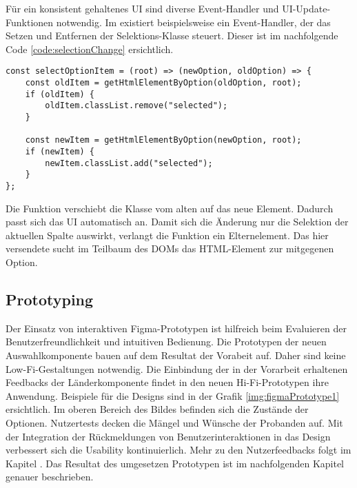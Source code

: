 Für ein konsistent gehaltenes UI sind diverse Event-Handler und UI-Update-Funktionen notwendig. 
Im  existiert beispielsweise ein Event-Handler, der das Setzen und Entfernen der Selektions-Klasse steuert. 
Dieser ist im nachfolgende Code \ref{code:selectionChange} ersichtlich. 

\begin{lstlisting}[style = htmlcssjs, caption = Änderung der Selektion, label = code:selectionChange]
const selectOptionItem = (root) => (newOption, oldOption) => {
    const oldItem = getHtmlElementByOption(oldOption, root);
    if (oldItem) {
        oldItem.classList.remove("selected");
    }

    const newItem = getHtmlElementByOption(newOption, root);
    if (newItem) {
        newItem.classList.add("selected");
    }
}; 
\end{lstlisting}

Die Funktion  verschiebt die Klasse  vom alten auf das neue Element. 
Dadurch passt sich das UI automatisch an. 
Damit sich die Änderung nur die Selektion der aktuellen Spalte auswirkt, verlangt die Funktion ein Elternelement. 
Das hier versendete  sucht im Teilbaum des DOMs das HTML-Element zur mitgegenen Option. 


\subsection{Prototyping}
\label{sec:userFeedbackPrototyping}

Der Einsatz von interaktiven Figma-Prototypen ist hilfreich beim Evaluieren der Benutzerfreundlichkeit und intuitiven Bedienung. 
Die Prototypen der neuen Auswahlkomponente bauen auf dem Resultat der Vorabeit auf. 
Daher sind keine Low-Fi-Gestaltungen notwendig. 
Die Einbindung der in der Vorarbeit erhaltenen Feedbacks der Länderkomponente findet in den neuen Hi-Fi-Prototypen ihre Anwendung. 
Beispiele für die Designs sind in der Grafik \ref{img:figmaPrototype1} ersichtlich. 
Im oberen Bereich des Bildes befinden sich die Zustände der Optionen. 
Nutzertests decken die Mängel und Wünsche der Probanden auf. 
Mit der Integration der Rückmeldungen von Benutzerinteraktionen in das Design verbessert sich die Usability kontinuierlich. 
Mehr zu den Nutzerfeedbacks folgt im Kapitel \textbf{}. 
Das Resultat des umgesetzen Prototypen ist im nachfolgenden Kapitel genauer beschrieben. 


